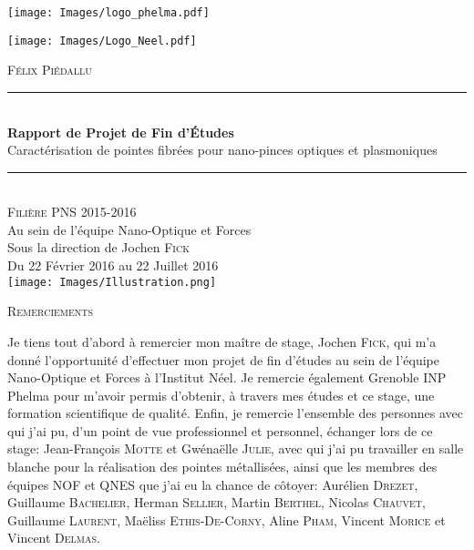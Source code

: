 \begin{titlepage}
    \vspace*{-10px}
    \texttt{[image: Images/logo\_phelma.pdf]}
    \vspace*{-80px}
\begin{flushright}
    \vspace*{-10px}
    \texttt{[image: Images/Logo\_Neel.pdf]}
\end{flushright}

\vspace*{1.5cm}
\begin{center}
\LARGE{\textsc{Félix Piédallu}}\\[1.5cm]

\rule{\linewidth}{0.5mm}\\[0.4cm]
{\huge{\bfseries Rapport de Projet de Fin d'Études}\\[0.4cm]
Caractérisation de pointes fibrées pour nano-pinces optiques et plasmoniques\\[0.4cm]}
\rule{\linewidth}{0.5mm}\\[0.5cm]

\large{\textsc{Filière PNS 2015-2016}}\\[2cm]

\Large{Au sein de l'équipe Nano-Optique et Forces}\\[1cm]

\Large{Sous la direction de Jochen \textsc{Fick}}\\[1cm]

\large{Du 22 Février 2016 au 22 Juillet 2016}\\[2cm]

\texttt{[image: Images/Illustration.png]}\\[1cm]


\end{center}
\end{titlepage}
\newpage\null\thispagestyle{empty}\newpage
\begin{center}
\textsc{\Large Remerciements}
\end{center}

\vspace{0.5cm}
Je tiens tout d'abord à remercier mon maître de stage, Jochen \textsc{Fick}, qui m'a donné l'opportunité d'effectuer mon projet de fin d'études au sein de l'équipe Nano-Optique et Forces à l'Institut Néel. Je remercie également Grenoble INP Phelma pour m'avoir permis d'obtenir, à travers mes études et ce stage, une formation scientifique de qualité.
Enfin, je remercie l'ensemble des personnes avec qui j'ai pu, d'un point de vue professionnel et personnel, échanger lors de ce stage: Jean-François \textsc{Motte} et Gwénaëlle \textsc{Julie}, avec qui j'ai pu travailler en salle blanche pour la réalisation des pointes métallisées, ainsi que les membres des équipes NOF et QNES que j'ai eu la chance de côtoyer: Aurélien \textsc{Drezet}, Guillaume \textsc{Bachelier}, Herman \textsc{Sellier}, Martin \textsc{Berthel}, Nicolas \textsc{Chauvet}, Guillaume \textsc{Laurent}, Maëliss \textsc{Ethis-De-Corny}, Aline \textsc{Pham}, Vincent \textsc{Morice} et Vincent \textsc{Delmas}.


\tableofcontents        %
\newpage
\listoffigures
{}  %
